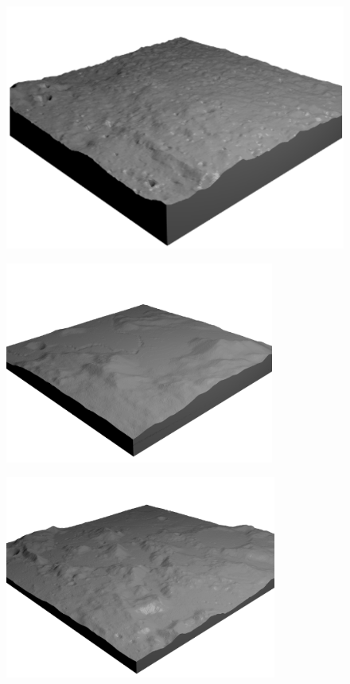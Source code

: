 \begin{figure}[htbp]
    \centering
    \begin{minipage}[b]{0.48\linewidth}
      \centering
      \includegraphics[keepaspectratio, scale=0.3]{images/NASA_moon.png}
      \label{fig:NASA_moon}
    \end{minipage}
    \begin{minipage}[b]{0.48\linewidth}
      \centering
      \includegraphics[keepaspectratio, scale=0.6]{images/NASA_moon2.png}
      \label{fig:NASA_moon2}
    \end{minipage}
    \begin{minipage}[b]{0.48\linewidth}
      \centering
      \includegraphics[keepaspectratio, scale=0.6]{images/NASA_moon3.png}

\end{minipage}
\end{figure}
